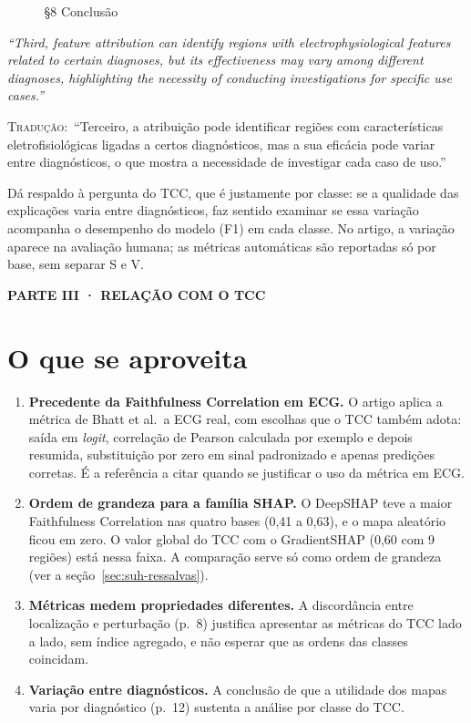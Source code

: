 \documentclass[11pt,a4paper]{article}
\newcommand{\pagechip}[1]{{\setlength{\fboxsep}{1.5pt}\colorbox{cAcc}{\textcolor{white}{\scriptsize\texttt{#1}}}}}
\newcommand{\partbar}[1]{\par\vspace{1.2em}\noindent\colorbox{black!80}{\parbox{\dimexpr\linewidth-2\fboxsep}{\color{white}\bfseries\sffamily\MakeUppercase{#1}}}\par\vspace{0.4em}}
\newenvironment{origquote}{\par\itshape\small}{\par}
\newenvironment{tradquote}{\par\small\textsc{Tradução:}\ }{\par}
\newcommand{\explab}[1]{\par\smallskip{\small\color{cAcc}\textbf{\MakeUppercase{#1}}}\par}
\begin{document}
\begin{citacard}{\pagechip{p. 12} §8 Conclusão}
\begin{origquote}“Third, feature attribution can identify regions with electrophysiological features related to certain diagnoses, but its effectiveness may vary among different diagnoses, highlighting the necessity of conducting investigations for specific use cases.”\end{origquote}
\begin{tradquote}“Terceiro, a atribuição pode identificar regiões com características eletrofisiológicas ligadas a certos diagnósticos, mas a sua eficácia pode variar entre diagnósticos, o que mostra a necessidade de investigar cada caso de uso.”\end{tradquote}
\explab{Explicação}
Dá respaldo à pergunta do TCC, que é justamente por classe: se a qualidade das explicações varia entre diagnósticos, faz sentido examinar se essa variação acompanha o desempenho do modelo (F1) em cada classe. No artigo, a variação aparece na avaliação humana; as métricas automáticas são reportadas só por base, sem separar S e V.
\end{citacard}

\partbar{Parte III · Relação com o TCC}

\section{O que se aproveita}
\begin{enumerate}
\item \textbf{Precedente da Faithfulness Correlation em ECG.} O artigo aplica a métrica de Bhatt et al.\ a ECG real, com escolhas que o TCC também adota: saída em \textit{logit}, correlação de Pearson calculada por exemplo e depois resumida, substituição por zero em sinal padronizado e apenas predições corretas. É a referência a citar quando se justificar o uso da métrica em ECG.
\item \textbf{Ordem de grandeza para a família SHAP.} O DeepSHAP teve a maior Faithfulness Correlation nas quatro bases (0,41 a 0,63), e o mapa aleatório ficou em zero. O valor global do TCC com o GradientSHAP (0,60 com 9 regiões) está nessa faixa. A comparação serve só como ordem de grandeza (ver a seção~\ref{sec:suh-ressalvas}).
\item \textbf{Métricas medem propriedades diferentes.} A discordância entre localização e perturbação (p.~8) justifica apresentar as métricas do TCC lado a lado, sem índice agregado, e não esperar que as ordens das classes coincidam.
\item \textbf{Variação entre diagnósticos.} A conclusão de que a utilidade dos mapas varia por diagnóstico (p.~12) sustenta a análise por classe do TCC.
\end{enumerate}
\end{document}
